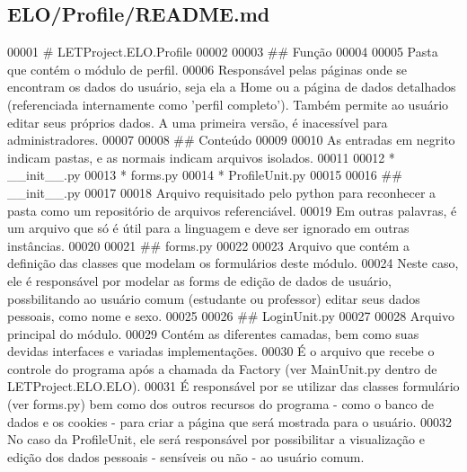 \hypertarget{ELO_2Profile_2README_8md_source}{\subsection{E\-L\-O/\-Profile/\-R\-E\-A\-D\-M\-E.md}
}

\begin{DoxyCode}
00001 \textcolor{preprocessor}{# LETProject.ELO.Profile}
00002 \textcolor{preprocessor}{}
00003 \textcolor{preprocessor}{## Função}
00004 \textcolor{preprocessor}{}
00005 Pasta que contém o módulo de perfil.
00006 Responsável pelas páginas onde se encontram os dados \textcolor{keywordflow}{do} usuário, seja ela a Home ou a página de dados 
      detalhados (referenciada internamente como \textcolor{stringliteral}{'perfil completo'}). Também permite ao usuário editar seus próprios 
      dados. A uma primeira versão, é inacessível para administradores.
00007 
00008 ## Conteúdo
00009 
00010 As entradas em negrito indicam pastas, e as normais indicam arquivos isolados.
00011 
00012 * \_\_init\_\_.py
00013 * forms.py
00014 * ProfileUnit.py
00015 
00016 \textcolor{preprocessor}{## \_\_init\_\_.py}
00017 \textcolor{preprocessor}{}
00018 Arquivo requisitado pelo python para reconhecer a pasta como um repositório de arquivos referenciável.
00019 Em outras palavras, é um arquivo que só é útil para a linguagem e deve ser ignorado em outras instâncias.
00020 
00021 ## forms.py
00022 
00023 Arquivo que contém a definição das classes que modelam os formulários deste módulo.
00024 Neste caso, ele é responsável por modelar as forms de edição de dados de usuário, possbilitando ao usuário 
      comum (estudante ou professor) editar seus dados pessoais, como nome e sexo.
00025 
00026 ## LoginUnit.py
00027 
00028 Arquivo principal \textcolor{keywordflow}{do} módulo.
00029 Contém as diferentes camadas, bem como suas devidas interfaces e variadas implementações.
00030 É o arquivo que recebe o controle \textcolor{keywordflow}{do} programa após a chamada da Factory (ver MainUnit.py dentro de 
      LETProject.ELO.ELO). 
00031 É responsável por se utilizar das classes formulário (ver forms.py) bem como dos outros recursos do 
      programa - como o banco de dados e os cookies - para criar a página que será mostrada para o usuário.
00032 No caso da ProfileUnit, ele será responsável por possibilitar a visualização e edição dos dados pessoais - 
      sensíveis ou não - ao usuário comum.
\end{DoxyCode}
